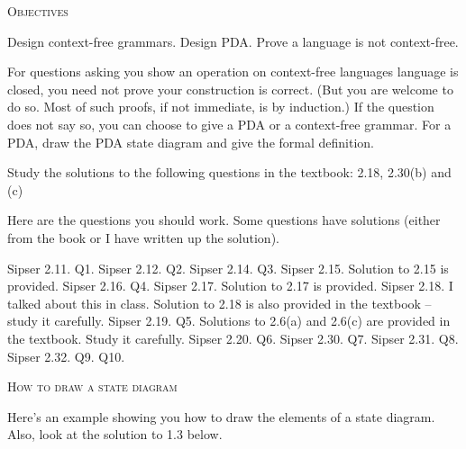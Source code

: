 

\renewcommand\AUTHOR{John Doe}


\topmatter

\textsc{Objectives}
\begin{itemize}
\li Design context-free grammars.
\li Design PDA.
\li Prove a language is not context-free.
\end{itemize}

For questions asking you show an operation on context-free languages
language is closed, you need not prove your construction is correct.
(But you are welcome to do so. Most of such proofs, if not immediate,
is by induction.)
If the question does not say so, you can choose to give a PDA or a
context-free grammar.
For a PDA, draw the PDA state diagram and give the formal definition.

Study the solutions to the following questions in the textbook:
2.18, 2.30(b) and (c)

Here are the questions you should work.
Some questions have solutions (either from
the book or I have written up the solution).
\begin{myenum}
\li Sipser 2.11. Q1. 
\li Sipser 2.12. Q2. 
\li Sipser 2.14. Q3. 
\li Sipser 2.15. Solution to 2.15 is provided.
\li Sipser 2.16. Q4.
\li Sipser 2.17. Solution to 2.17 is provided.
\li Sipser 2.18. I talked about this in class. Solution to 2.18 is also provided in the textbook -- study it carefully.
\li Sipser 2.19. Q5. Solutions to 2.6(a) and 2.6(c) are provided in the textbook. Study it carefully.
\li Sipser 2.20. Q6.
\li Sipser 2.30. Q7. 
\li Sipser 2.31. Q8.
\li Sipser 2.32. Q9.
\li Q10.  
\end{myenum}

\newpage
\textsc{How to draw a state diagram}

Here's an example showing you how to draw the elements of a state diagram.
Also, look at the solution to 1.3 below.

